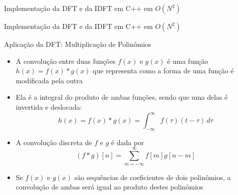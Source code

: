 \begin{frame}[fragile]{Implementação da DFT e da IDFT em C++ em $O(N^2)$}
\end{frame}

\begin{frame}[fragile]{Implementação da DFT e da IDFT em C++ em $O(N^2)$}
\end{frame}

\begin{frame}[fragile]{Aplicação da DFT: Multiplicação de Polinômios}

    \begin{itemize}
        \item A convolução entre duas funções $f(x)$ e $g(x)$ é uma função $h(x) = f(x)*g(x)$
            que representa como a forma de uma função é modificada pela outra

        \item Ela é a integral do produto de ambas funções, sendo que uma delas é invertida e
            deslocada:
        \[
            h(x) = f(x)*g(x) = \int_{-\infty}^\infty f(\tau)(t - \tau)\, d\tau
        \]

        \item A convolução discreta de $f$ e $g$ é dada por
        \[
            (f * g)[n] = \sum_{m=-\infty}^\infty f[m]g[n - m]
        \]

        \item Se $f(x)$ e $g(x)$ são sequências de coeficientes de dois polinômios, a convolução
            de ambas será igual ao produto destes polinômios
    \end{itemize}

\end{frame}



